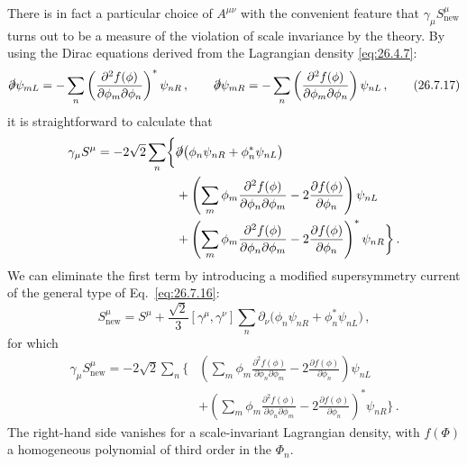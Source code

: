 There is in fact a particular choice of \(A^{\mu\nu}\) with the convenient
feature that \(\gamma_\mu S_{\mathrm{new}}^\mu\) turns out to be a measure of
the violation of scale invariance by the theory. By using the Dirac equations
derived from the Lagrangian density \eqref{eq:26.4.7}:
\begin{equation}
  \sl{\partial}\psi_{mL}
  =-\sum_n
   \left(
    \frac{\partial^2f(\phi)}{\partial\phi_m\partial\phi_n}
   \right)^*\psi_{nR}\,,
  \qquad
  \sl{\partial}\psi_{mR}
  =-\sum_n
   \left(
    \frac{\partial^2f(\phi)}{\partial\phi_m\partial\phi_n}
   \right)\psi_{nL}\,,
  \tag{26.7.17}\label{eq:26.7.17}
\end{equation}
it is straightforward to calculate that
\[
  \begin{aligned}
  \gamma_\mu S^\mu=-2\sqrt{2}\sum_n\biggl\{
    &\sl{\partial}\bigl(\phi_n\psi_{nR}+\phi_n^*\psi_{nL}\bigr)
  \\
    &+\left(
      \sum_m\phi_m
       \frac{\partial^2f(\phi)}{\partial\phi_n\partial\phi_m}
      -2\frac{\partial f(\phi)}{\partial\phi_n}
     \right)\psi_{nL}
  \\
    &+\left(
      \sum_m\phi_m
       \frac{\partial^2f(\phi)}{\partial\phi_n\partial\phi_m}
      -2\frac{\partial f(\phi)}{\partial\phi_n}
     \right)^*\psi_{nR}
  \biggr\}\,.
  \end{aligned}
\]
We can eliminate the first term by introducing a modified supersymmetry
current of the general type of Eq.~\eqref{eq:26.7.16}:
\begin{equation}
  S_{\mathrm{new}}^\mu
  =S^\mu+\frac{\sqrt{2}}{3}[\gamma^\mu,\gamma^\nu]
   \sum_n\partial_\nu
   \bigl(\phi_n\psi_{nR}+\phi_n^*\psi_{nL}\bigr)\,,
  \tag{26.7.18}\label{eq:26.7.18}
\end{equation}
for which
\begin{equation}
  \begin{aligned}
  \gamma_\mu S_{\mathrm{new}}^\mu
  =-2\sqrt{2}\sum_n\biggl\{
    &\left(
      \sum_m\phi_m
       \frac{\partial^2f(\phi)}{\partial\phi_n\partial\phi_m}
      -2\frac{\partial f(\phi)}{\partial\phi_n}
     \right)\psi_{nL}
  \\
    &+\left(
      \sum_m\phi_m
       \frac{\partial^2f(\phi)}{\partial\phi_n\partial\phi_m}
      -2\frac{\partial f(\phi)}{\partial\phi_n}
     \right)^*\psi_{nR}
  \biggr\}\,.
  \end{aligned}
  \tag{26.7.19}\label{eq:26.7.19}
\end{equation}
The right-hand side vanishes for a scale-invariant Lagrangian density, with
\(f(\Phi)\) a homogeneous polynomial of third order in the \(\Phi_n\).

